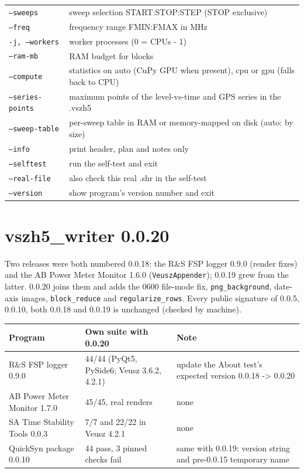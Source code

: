 \documentclass[11pt,a4paper]{article}
\newcommand{\code}[1]{\texttt{#1}}
\begin{document}
\begin{longtable}{p{4.6cm}p{11cm}}
\texttt{--sweeps} & sweep selection START:STOP:STEP (STOP exclusive)\\
\texttt{--freq} & frequency range FMIN:FMAX in MHz\\
\texttt{-j, --workers} & worker processes (0 = CPUs - 1)\\
\texttt{--ram-mb} & RAM budget for blocks\\
\texttt{--compute} & statistics on auto (CuPy GPU when present), cpu or gpu (falls back to CPU)\\
\texttt{--series-points} & maximum points of the level-vs-time and GPS series in the .vszh5\\
\texttt{--sweep-table} & per-sweep table in RAM or memory-mapped on disk (auto: by size)\\
\texttt{--info} & print header, plan and notes only\\
\texttt{--selftest} & run the self-test and exit\\
\texttt{--real-file} & also check this real .shr in the self-test\\
\texttt{--version} & show program's version number and exit\\
\bottomrule
\end{longtable}

\section{vszh5\_writer 0.0.20}
Two releases were both numbered 0.0.18: the R\&S FSP logger 0.9.0 (render fixes) and the AB Power Meter
Monitor 1.6.0 (\code{VeuszAppender}); 0.0.19 grew from the latter. 0.0.20 joins them and adds the 0600 file-mode
fix, \code{png\_background}, date-axis images, \code{block\_reduce} and \code{regularize\_rows}. Every public
signature of 0.0.5, 0.0.10, both 0.0.18 and 0.0.19 is unchanged (checked by machine).
\begin{longtable}{p{4.4cm}p{5.4cm}p{6cm}}
\toprule
\textbf{Program} & \textbf{Own suite with 0.0.20} & \textbf{Note}\\
\midrule
\endhead
R\&S FSP logger 0.9.0 & 44/44 (PyQt5, PySide6; Veusz 3.6.2, 4.2.1) & update the About test's expected version 0.0.18 -\textgreater{} 0.0.20\\
AB Power Meter Monitor 1.7.0 & 45/45, real renders & none\\
SA Time Stability Tools 0.0.3 & 7/7 and 22/22 in Veusz 4.2.1 & none\\
QuickSyn package 0.0.10 & 44 pass, 3 pinned checks fail & same with 0.0.19: version string and pre-0.0.15 temporary name\\
\bottomrule
\end{longtable}
\end{document}
